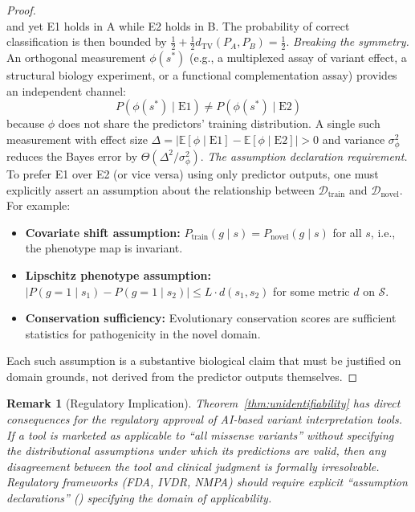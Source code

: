 \documentclass[11pt,a4paper]{article}
\newtheorem{remark}[theorem]{Remark}
\theoremstyle{definition}
\newcommand{\E}{\mathbb{E}}
\newcommand{\calD}{\mathcal{D}}
\newcommand{\calS}{\mathcal{S}}
\begin{document}
\begin{proof}
\begin{equation}
\end{equation}
and yet E1 holds in A while E2 holds in B.
The probability of correct classification is then bounded by $\frac{1}{2} + \frac{1}{2}d_{\text{TV}}(P_A, P_B) = \frac{1}{2}$.
\medskip\noindent\textit{Breaking the symmetry.}
An orthogonal measurement $\phi(s^*)$ (e.g., a multiplexed assay of variant effect, a structural biology experiment, or a functional complementation assay) provides an independent channel:
\begin{equation}
    P(\phi(s^*) \mid \text{E1}) \neq P(\phi(s^*) \mid \text{E2})
\end{equation}
because $\phi$ does not share the predictors' training distribution.
A single such measurement with effect size $\Delta = |\E[\phi \mid \text{E1}] - \E[\phi \mid \text{E2}]| > 0$ and variance $\sigma_\phi^2$ reduces the Bayes error by $\Theta(\Delta^2 / \sigma_\phi^2)$.
\medskip\noindent\textit{The assumption declaration requirement.}
To prefer E1 over E2 (or vice versa) using only predictor outputs, one must explicitly assert an assumption about the relationship between $\calD_{\text{train}}$ and $\calD_{\text{novel}}$.
For example:
\begin{itemize}[leftmargin=*]
    \item \textbf{Covariate shift assumption:} $P_{\text{train}}(g \mid s) = P_{\text{novel}}(g \mid s)$ for all $s$, i.e., the phenotype map is invariant.
    \item \textbf{Lipschitz phenotype assumption:} $|P(g=1 \mid s_1) - P(g=1 \mid s_2)| \leq L \cdot d(s_1, s_2)$ for some metric $d$ on $\calS$.
    \item \textbf{Conservation sufficiency:} Evolutionary conservation scores are sufficient statistics for pathogenicity in the novel domain.
\end{itemize}
Each such assumption is a substantive biological claim that must be justified on domain grounds, not derived from the predictor outputs themselves.
\end{proof}
\begin{remark}[Regulatory Implication]
Theorem~\ref{thm:unidentifiability} has direct consequences for the regulatory approval of AI-based variant interpretation tools.
If a tool is marketed as applicable to ``all missense variants'' without specifying the distributional assumptions under which its predictions are valid, then any disagreement between the tool and clinical judgment is formally irresolvable.
Regulatory frameworks (FDA, IVDR, NMPA) should require explicit ``assumption declarations'' () specifying the domain of applicability.
\end{remark}
\end{document}
